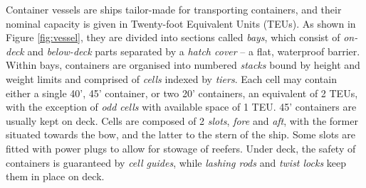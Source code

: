\documentclass[preprint,12pt,3p]{elsarticle}
\begin{document}
Container vessels are ships tailor-made for transporting containers, and their nominal capacity is given in Twenty-foot Equivalent Units (TEUs). As shown in Figure \ref{fig:vessel}, they are divided into sections called \textit{bays}, which consist of \textit{on-deck} and \textit{below-deck} parts separated by a \textit{hatch cover} -- a flat, waterproof barrier. Within bays, containers are organised into numbered \textit{stacks} bound by height and weight limits and comprised of \textit{cells} indexed by \textit{tiers}. Each cell may contain either a single 40', 45' container, or two 20' containers, an equivalent of 2 TEUs, with the exception of \textit{odd cells} with available space of 1 TEU. 45' containers are usually kept on deck. Cells are composed of 2 \textit{slots}, \textit{fore} and \textit{aft}, with the former situated towards the bow, and the latter to the stern of the ship. Some slots are fitted with power plugs to allow for stowage of reefers. Under deck, the safety of containers is guaranteed by \textit{cell guides}, while \textit{lashing rods} and \textit{twist locks} keep them in place on deck.
\end{document}
